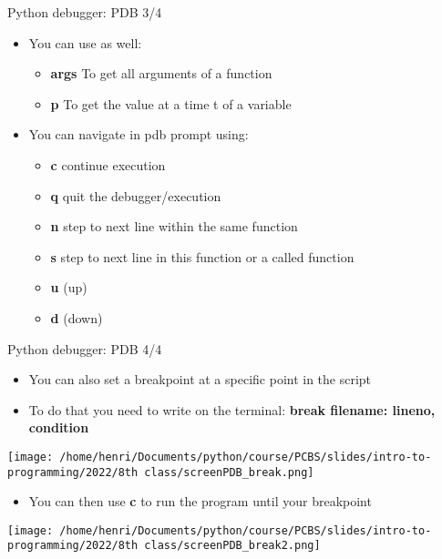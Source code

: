 \documentclass[
  8pt,
  ignorenonframetext,
]{beamer}
\providecommand{\tightlist}{%
  \setlength{\itemsep}{0pt}\setlength{\parskip}{0pt}}
\begin{document}
\begin{frame}{Python debugger: PDB 3/4}
\protect\hypertarget{python-debugger-pdb-34}{}
\begin{itemize}
\tightlist
\item
  You can use as well:

  \begin{itemize}
  \tightlist
  \item
    \textbf{args} To get all arguments of a function
  \item
    \textbf{p} To get the value at a time t of a variable
  \end{itemize}
\item
  You can navigate in pdb prompt using:

  \begin{itemize}
  \tightlist
  \item
    \textbf{c} continue execution
  \item
    \textbf{q} quit the debugger/execution
  \item
    \textbf{n} step to next line within the same function
  \item
    \textbf{s} step to next line in this function or a called function
  \item
    \textbf{u} (up)
  \item
    \textbf{d} (down)
  \end{itemize}
\end{itemize}
\end{frame}

\begin{frame}{Python debugger: PDB 4/4}
\protect\hypertarget{python-debugger-pdb-44}{}
\begin{itemize}
\item
  You can also set a breakpoint at a specific point in the script
\item
  To do that you need to write on the terminal: \textbf{break filename:
  lineno, condition}
\end{itemize}

\texttt{[image: /home/henri/Documents/python/course/PCBS/slides/intro-to-programming/2022/8th class/screenPDB\_break.png]}

\begin{itemize}
\tightlist
\item
  You can then use \textbf{c} to run the program until your breakpoint
\end{itemize}

\texttt{[image: /home/henri/Documents/python/course/PCBS/slides/intro-to-programming/2022/8th class/screenPDB\_break2.png]}
\end{frame}
\end{document}
